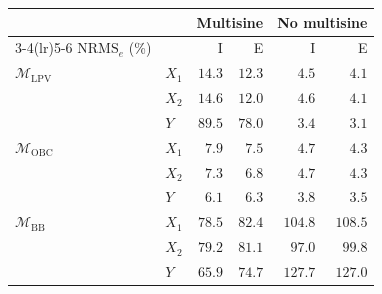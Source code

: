 \setlength{\tabcolsep}{3pt}
\begin{tabular}{l l r r r r}
\toprule
 & & \multicolumn{2}{c}{Multisine} & \multicolumn{2}{c}{No multisine}\\
\cmidrule(lr){3-4}\cmidrule(lr){5-6}
$\mathrm{NRMS}_e$ (\%) & & I & E & I & E\\
\midrule
$\mathcal{M}_{\mathrm{LPV}}$ & $X_1$ & $14.3$ & $12.3$ & $4.5$ & $4.1$\\
 & $X_2$ & $14.6$ & $12.0$ & $4.6$ & $4.1$\\
 & $Y$ & $89.5$ & $78.0$ & $3.4$ & $3.1$\\
\midrule
$\mathcal{M}_{\mathrm{OBC}}$ & $X_1$ & $7.9$ & $7.5$ & $4.7$ & $4.3$\\
 & $X_2$ & $7.3$ & $6.8$ & $4.7$ & $4.3$\\
 & $Y$ & $6.1$ & $6.3$ & $3.8$ & $3.5$\\
\midrule
$\mathcal{M}_{\mathrm{BB}}$ & $X_1$ & $78.5$ & $82.4$ & $104.8$ & $108.5$\\
 & $X_2$ & $79.2$ & $81.1$ & $97.0$ & $99.8$\\
 & $Y$ & $65.9$ & $74.7$ & $127.7$ & $127.0$\\
\bottomrule
\end{tabular}
